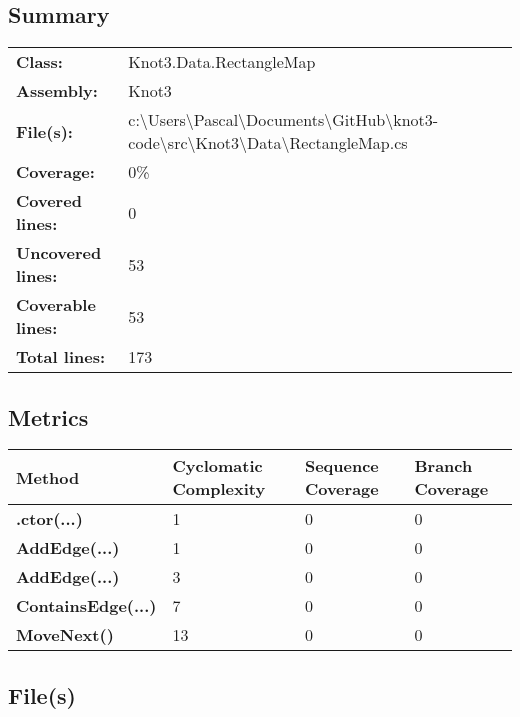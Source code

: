 \documentclass[a4paper,10pt]{article}
\begin{document}
\subsection{Summary}
\begin{longtable}[l]{ll}
\textbf{Class:} & Knot3.Data.RectangleMap\\
\textbf{Assembly:} & Knot3\\
\textbf{File(s):} & \begin{minipage}[t]{12cm}{c:\textbackslash Users\textbackslash Pascal\textbackslash Documents\textbackslash GitHub\textbackslash knot3-code\textbackslash src\textbackslash Knot3\textbackslash Data\textbackslash RectangleMap.cs}\end{minipage} \\
\textbf{Coverage:} & 0\%\\
\textbf{Covered lines:} & 0\\
\textbf{Uncovered lines:} & 53\\
\textbf{Coverable lines:} & 53\\
\textbf{Total lines:} & 173\\
\end{longtable}
\subsection{Metrics}
\begin{longtable}[l]{|l|l|l|l|}
\hline
\textbf{Method} & \textbf{Cyclomatic Complexity} & \textbf{Sequence Coverage} & \textbf{Branch Coverage}\\
\hline
\textbf{.ctor(...)} & 1 & 0 & 0\\
\hline
\textbf{AddEdge(...)} & 1 & 0 & 0\\
\hline
\textbf{AddEdge(...)} & 3 & 0 & 0\\
\hline
\textbf{ContainsEdge(...)} & 7 & 0 & 0\\
\hline
\textbf{MoveNext()} & 13 & 0 & 0\\
\hline
\end{longtable}
\subsection{File(s)}
\end{document}
